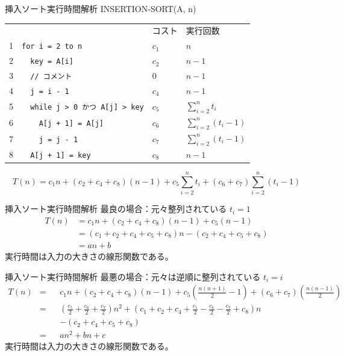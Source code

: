 \documentclass[unicode,11pt,aspectratio=169,hide notes]{beamer} %
\begin{document}
\begin{frame}[fragile]{挿入ソート}{実行時間解析}
  INSERTION-SORT(A, n)

  \begin{tabular}{rlll}
    & & コスト & 実行回数 \\
    1 & \verb|for i = 2 to n| & $c_1$ & $n$ \\
    2 & \verb|  key = A[i]| & $c_2$ & $n-1$ \\
    3 & \verb|  // コメント| & $0$ & $n-1$ \\
    4 & \verb|  j = i - 1| & $c_4$ & $n-1$ \\
    5 & \verb|  while j > 0 かつ A[j] > key| & $c_5$ & $\sum_{i=2}^nt_i$ \\
    6 & \verb|    A[j + 1] = A[j]| & $c_6$ & $\sum_{i=2}^n\left(t_i-1\right)$ \\
    7 & \verb|    j = j - 1| & $c_7$ & $\sum_{i=2}^n\left(t_i-1\right)$ \\
    8 & \verb|  A[j + 1] = key| & $c_8$ & $n-1$
  \end{tabular}
  \[
    T(n) = c_1n + \left(c_2+c_4+c_8\right)\left(n-1\right) + c_5\sum_{i=2}^nt_i
    + \left(c_6+c_7\right)\sum_{i=2}^n\left(t_i-1\right)
  \]
\end{frame}

\begin{frame}{挿入ソート}{実行時間解析}
  最良の場合：元々整列されている $ t_i = 1 $
  \begin{align*}
    T(n) &= c_1n + \left(c_2+c_4+c_8\right)\left(n-1\right)
                 + c_5\left(n-1\right) \\
         &= \left(c_1+c_2+c_4+c_5+c_8\right)n - \left(c_2+c_4+c_5+c_8\right) \\
         &= an + b
  \end{align*}
  実行時間は入力の大きさの線形関数である。
\end{frame}

\begin{frame}{挿入ソート}{実行時間解析}
  最悪の場合：元々は逆順に整列されている $ t_i = i $
  \begin{align*}
    T(n) &= &&c_1n + \left(c_2+c_4+c_8\right)\left(n-1\right)
                 + c_5\left(\frac{n(n+1)}{2}-1\right)
                 + \left(c_6+c_7\right)\left(\frac{n(n-1)}{2}\right) \\
         &= &&\left(\frac{c_5}{2}+\frac{c_6}{2}+\frac{c_7}{2}\right)n^2
            + \left(c_1+c_2+c_4+\frac{c_5}{2}-\frac{c_6}{2}-\frac{c_7}{2}+c_8\right)n \\
         &  &&- \left(c_2+c_4+c_5+c_8\right) \\
         &= &&an^2 + bn + c
  \end{align*}
  実行時間は入力の大きさの線形関数である。
\end{frame}
\end{document}
